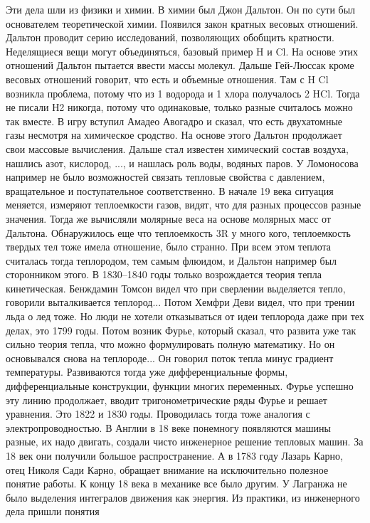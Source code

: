 \documentclass[a4paper, 12pt]{article}
\begin{document}
Эти дела шли из физики и химии. В химии был Джон Дальтон. Он по сути был 
основателем теоретической химии. Появился закон кратных весовых 
отношений. Дальтон проводит серию исследований, позволяющих обобщить 
кратности. Неделящиеся вещи могут объединяться, базовый пример H и Cl. 
На основе этих отношений Дальтон пытается ввести массы молекул. Дальше 
Гей-Люссак кроме весовых отношений говорит, что есть и объемные 
отношения. Там с H Cl возникла проблема, потому что из 1 водорода 
и 1 хлора получалось 2 HCl. Тогда не писали Н2 никогда, потому что 
одинаковые, только разные считалось можно так вместе. В игру вступил 
Амадео Авогадро и сказал, что есть двухатомные газы несмотря на 
химическое сродство. На основе этого Дальтон продолжает свои массовые 
вычисления. Дальше стал известен химический состав воздуха, нашлись 
азот, кислород, ..., и нашлась роль воды, водяных паров. У Ломоносова 
например не было возможностей связать тепловые свойства с давлением, 
вращательное и поступательное соответственно. В начале 19 века ситуация 
меняется, измеряют теплоемкости газов, видят, что для разных процессов 
разные значения. Тогда же вычисляли молярные веса на основе молярных 
масс от Дальтона. Обнаружилось еще что теплоемкость 3R у много кого, 
теплоемкость твердых тел тоже имела отношение, было странно. При всем 
этом теплота считалась тогда теплородом, тем самым флюидом, и Дальтон 
например был сторонником этого. В 1830--1840 годы только возрождается 
теория тепла кинетическая. Бенждамин Томсон видел что при сверлении 
выделяется тепло, говорили выталкивается теплород... Потом Хемфри Деви 
видел, что при трении льда о лед тоже. Но люди не хотели отказываться от 
идеи теплорода даже при тех делах, это 1799 годы. Потом возник Фурье, 
который сказал, что развита уже так сильно теория тепла, что можно 
формулировать полную математику. Но он основывался снова на теплороде... 
Он говорил поток тепла минус градиент температуры. Развиваются тогда уже 
дифференциальные формы, дифференциальные конструкции, функции многих 
переменных. Фурье успешно эту линию продолжает, вводит 
тригонометрические ряды Фурье и решает уравнения. Это 1822 и 1830 годы. 
Проводилась тогда тоже аналогия с электропроводностью. В Англии в 18 
веке понемногу появляются машины разные, их надо двигать, создали чисто 
инженерное решение тепловых машин. За 18 век они получили большое 
распространение. А в 1783 году Лазарь Карно, отец Николя Сади Карно, 
обращает внимание на исключительно полезное понятие работы. К концу 18 
века в механике все было другим. У Лагранжа не было выделения интегралов 
движения как энергия. Из практики, из инженерного дела пришли понятия 
\end{document}
